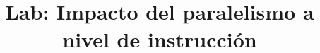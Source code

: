 

\title{Lab: Impacto del paralelismo a nivel de instrucción}



\maketitle

\pagestyle{fancyplain}





